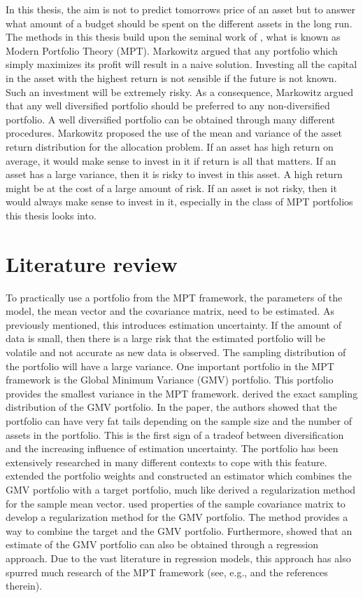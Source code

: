 In this thesis, the aim is not to predict tomorrows price of an asset but to answer what amount of a budget should be spent on the different assets in the long run.
The methods in this thesis build upon the seminal work of \citet{markowitz1959portfolio}, what is known as Modern Portfolio Theory (MPT).
Markowitz argued that any portfolio which simply maximizes its profit will result in a naive solution.
Investing all the capital in the asset with the highest return is not sensible if the future is not known.
Such an investment will be extremely risky. 
As a consequence, Markowitz argued that any well diversified portfolio should be preferred to any non-diversified portfolio. 
A well diversified portfolio can be obtained through many different procedures.
Markowitz proposed the use of the mean and variance of the asset return distribution for the allocation problem.
If an asset has high return on average, it would make sense to invest in it if return is all that matters.
If an asset has a large variance, then it is risky to invest in this asset. 
A high return might be at the cost of a large amount of risk.
If an asset is not risky, then it would always make sense to invest in it, especially in the class of MPT portfolios this thesis looks into.

\section{Literature review}
To practically use a portfolio from the MPT framework, the parameters of the model, the mean vector and the covariance matrix, need to be estimated.
As previously mentioned, this introduces estimation uncertainty.
If the amount of data is small, then there is a large risk that the estimated portfolio will be volatile and not accurate as new data is observed.
The sampling distribution of the portfolio will have a large variance.
One important portfolio in the MPT framework is the Global Minimum Variance (GMV) portfolio.
This portfolio provides the smallest variance in the MPT framework.
\citet{okhrin2006distributional} derived the exact sampling distribution of the GMV portfolio. 
In the paper, the authors showed that the portfolio can have very fat tails depending on the sample size and the number of assets in the portfolio.
This is the first sign of a tradeof between diversification and the increasing influence of estimation uncertainty.
The portfolio has been extensively researched in many different contexts to cope with this feature.
\citet{frahm2010} extended the portfolio weights and constructed an estimator which combines the GMV portfolio with a target portfolio, much like \citet{stein1956} derived a regularization method for the sample mean vector. 
\citet{frahm2010} used properties of the sample covariance matrix to develop a regularization method for the GMV portfolio.
The method provides a way to combine the target and the GMV portfolio.
Furthermore, \citet{kempf2006estimating} showed that an estimate of the GMV portfolio can also be obtained through a regression approach.
Due to the vast literature in regression models, this approach has also spurred much research of the MPT framework (see, e.g., \citet{maillet2015global} and the references therein).

